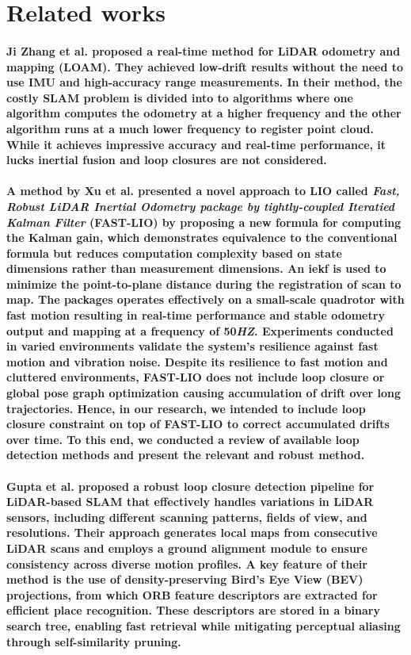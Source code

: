 \section{Related works}
\label{sec:related_work}
\paragraph{\textnormal{Ji Zhang et al.  \cite{zhang2014loam} proposed a real-time method for LiDAR odometry and mapping (LOAM). They achieved low-drift results without the need to use IMU and high-accuracy range measurements. In their method, the costly SLAM problem is divided into to algorithms where one algorithm computes the odometry at a higher frequency and the other algorithm runs at a much lower frequency to register point cloud. While it achieves impressive accuracy and real-time performance, it lucks inertial fusion and loop closures are not considered.}}
\paragraph{\textnormal{A method by Xu et al. \cite{xu2021fastlio} presented a novel approach to LIO called \textit{Fast, Robust LiDAR Inertial Odometry package by tightly-coupled Iteratied Kalman Filter }(FAST-LIO) by proposing a new formula for computing the Kalman gain, which demonstrates equivalence to the conventional formula but reduces computation complexity based on state dimensions rather than measurement dimensions. An \gls{iekf} is used to minimize the point-to-plane distance during the registration of scan to map. The packages operates effectively on a small-scale quadrotor with fast motion resulting in real-time performance and stable odometry output and mapping at a frequency of 50\textit{HZ}. Experiments conducted in varied environments validate the system's resilience against fast motion and vibration noise. Despite its resilience to fast motion and cluttered environments, FAST-LIO does  not include loop closure or global pose graph optimization causing accumulation of drift over long trajectories.  Hence, in our research, we intended to include loop closure constraint on top of FAST-LIO to correct accumulated drifts over time. To this end, we conducted a review of available loop detection methods and present the relevant and robust method.}}

\paragraph{\textnormal{Gupta et al.\cite{gupta2024icra} proposed a robust loop closure detection pipeline for LiDAR-based SLAM that effectively handles variations in LiDAR sensors, including different scanning patterns, fields of view, and resolutions. Their approach generates local maps from consecutive LiDAR scans and employs a ground alignment module to ensure consistency across diverse motion profiles. A key feature of their method is the use of density-preserving Bird’s Eye View (BEV) projections, from which ORB feature descriptors are extracted for efficient place recognition. These descriptors are stored in a binary search tree, enabling fast retrieval while mitigating perceptual aliasing through self-similarity pruning.}}

